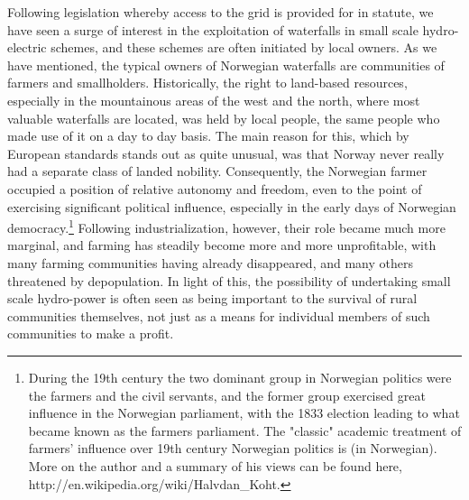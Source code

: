 Following legislation whereby access to the grid is provided for in statute, we have seen a surge of interest in the exploitation of waterfalls in small scale hydro-electric schemes, and these schemes are often initiated by local owners. As we have mentioned, the typical owners of Norwegian waterfalls are communities of farmers and smallholders. Historically, the right to land-based resources, especially in the mountainous areas of the west and the north, where most valuable waterfalls are located, was held by local people, the same people who made use of it on a day to day basis. The main reason for this, which by European standards stands out as quite unusual, was that Norway never really had a separate class of landed nobility. Consequently, the Norwegian farmer occupied a position of relative autonomy and freedom, even to the point of exercising significant political influence, especially in the early days of Norwegian democracy.\footnote{During the 19th century the two dominant group in Norwegian politics were the farmers and the civil servants, and the former group exercised great influence in the Norwegian parliament, with the 1833 election leading to what became known as the farmers parliament. The "classic" academic treatment of farmers' influence over 19th century Norwegian politics is \cite{Koht} (in Norwegian). More on the author and a summary of his views can be found here, http://en.wikipedia.org/wiki/Halvdan\_Koht.} Following industrialization, however, their role became much more marginal, and farming has steadily become more and more unprofitable, with many farming communities having already disappeared, and many others threatened by depopulation. In light of this, the possibility of undertaking small scale hydro-power is often seen as being important to the survival of rural communities themselves, not just as a means for individual members of such communities to make a profit.

